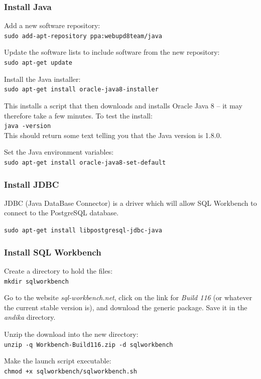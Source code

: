 \subsubsection{Install Java}

Add a new software repository:\\
\verb|sudo add-apt-repository ppa:webupd8team/java|

Update the software lists to include software from the new repository:\\
\verb|sudo apt-get update|

Install the Java installer:\\
\verb|sudo apt-get install oracle-java8-installer|

This installs a script that then downloads and installs Oracle Java 8 -- it may therefore take a few minutes.  To test the install:\\
\verb|java -version|\\
This should return some text telling you that the Java version is 1.8.0.

Set the Java environment variables:\\
\verb|sudo apt-get install oracle-java8-set-default|

\subsubsection{Install JDBC}
\label{ss:jdbc}

JDBC (Java DataBase Connector) is a driver which will allow SQL Workbench to connect to the PostgreSQL database.

\verb|sudo apt-get install libpostgresql-jdbc-java|

\subsubsection{Install SQL Workbench}

Create a directory to hold the files:\\
\verb|mkdir sqlworkbench|

Go to the website \textit{sql-workbench.net}, click on the link for \textit{Build 116} (or whatever the current stable version is), and download the generic package.  Save it in the \textit{andika} directory.

Unzip the download into the new directory:\\
\verb|unzip -q Workbench-Build116.zip -d sqlworkbench|

Make the launch script executable:\\
\verb|chmod +x sqlworkbench/sqlworkbench.sh|

